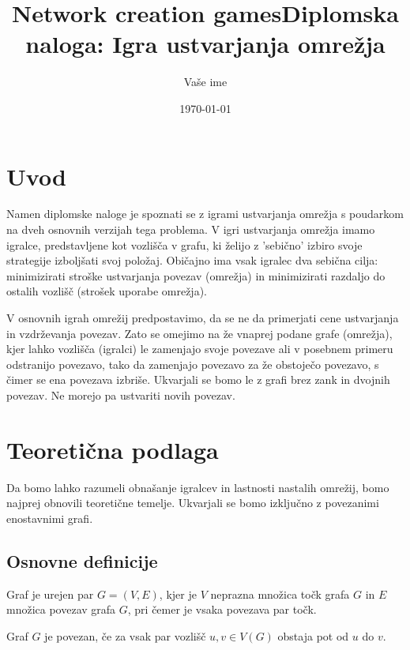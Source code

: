 \documentclass[fin1, tisk]{fmfdelo}
\title{Network creation games}
\begin{document}
\title{Diplomska naloga: Igra ustvarjanja omrežja}
\author{Vaše ime}
\date{\today}
\maketitle

\section{Uvod}

Namen diplomske naloge je spoznati se z igrami ustvarjanja omrežja s poudarkom na dveh osnovnih verzijah tega problema.
V igri ustvarjanja omrežja imamo igralce, predstavljene kot vozlišča v grafu, ki želijo z 'sebično' izbiro svoje
strategije izboljšati svoj položaj. Običajno ima vsak igralec dva sebična cilja: minimizirati stroške
ustvarjanja povezav (omrežja) in minimizirati razdaljo do ostalih vozlišč (strošek uporabe omrežja).

V osnovnih igrah omrežij predpostavimo, da se ne da primerjati cene ustvarjanja in vzdrževanja povezav. Zato se
omejimo na že vnaprej podane grafe (omrežja), kjer lahko vozlišča (igralci) le zamenjajo svoje povezave ali v
posebnem primeru odstranijo povezavo, tako da zamenjajo povezavo za že obstoječo povezavo, s čimer se ena povezava
izbriše. Ukvarjali se bomo le z grafi brez zank in dvojnih povezav. Ne morejo pa ustvariti novih povezav.

\section{Teoretična podlaga}

Da bomo lahko razumeli obnašanje igralcev in lastnosti nastalih omrežij, bomo najprej obnovili teoretične temelje.
Ukvarjali se bomo izključno z povezanimi enostavnimi grafi.

\subsection{Osnovne definicije}

\begin{definicija}
Graf je urejen par \(G = (V, E)\), kjer je \(V\) neprazna množica točk grafa \(G\) in \(E\) množica povezav grafa \(G\), pri čemer je vsaka povezava par točk.
\end{definicija}

\begin{definicija}
Graf \(G\) je povezan, če za vsak par vozlišč \(u, v \in V(G)\) obstaja pot od \(u\) do \(v\).
\end{definicija}
\end{document}
